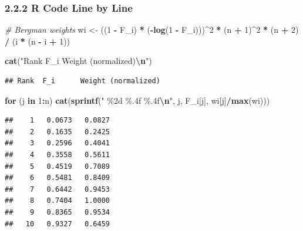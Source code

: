 \documentclass[
]{article}
\newenvironment{Shaded}{\begin{snugshade}}{\end{snugshade}}
\newcommand{\CommentTok}[1]{\textcolor[rgb]{0.56,0.35,0.01}{\textit{#1}}}
\newcommand{\ControlFlowTok}[1]{\textcolor[rgb]{0.13,0.29,0.53}{\textbf{#1}}}
\newcommand{\DecValTok}[1]{\textcolor[rgb]{0.00,0.00,0.81}{#1}}
\newcommand{\FunctionTok}[1]{\textcolor[rgb]{0.13,0.29,0.53}{\textbf{#1}}}
\newcommand{\NormalTok}[1]{#1}
\newcommand{\OtherTok}[1]{\textcolor[rgb]{0.56,0.35,0.01}{#1}}
\newcommand{\SpecialCharTok}[1]{\textcolor[rgb]{0.81,0.36,0.00}{\textbf{#1}}}
\newcommand{\StringTok}[1]{\textcolor[rgb]{0.31,0.60,0.02}{#1}}
\begin{document}
\subsubsection{2.2.2 R Code Line by Line}\label{r-code-line-by-line-1}

\begin{Shaded}
\begin{Highlighting}[]
\CommentTok{\# Bergman weights}
\NormalTok{wi }\OtherTok{\textless{}{-}}\NormalTok{ ((}\DecValTok{1} \SpecialCharTok{{-}}\NormalTok{ F\_i) }\SpecialCharTok{*}\NormalTok{ (}\SpecialCharTok{{-}}\FunctionTok{log}\NormalTok{(}\DecValTok{1} \SpecialCharTok{{-}}\NormalTok{ F\_i)))}\SpecialCharTok{\^{}}\DecValTok{2} \SpecialCharTok{*}\NormalTok{ (n }\SpecialCharTok{+} \DecValTok{1}\NormalTok{)}\SpecialCharTok{\^{}}\DecValTok{2} \SpecialCharTok{*}\NormalTok{ (n }\SpecialCharTok{+} \DecValTok{2}\NormalTok{) }\SpecialCharTok{/}\NormalTok{ (i }\SpecialCharTok{*}\NormalTok{ (n }\SpecialCharTok{{-}}\NormalTok{ i }\SpecialCharTok{+} \DecValTok{1}\NormalTok{))}

\FunctionTok{cat}\NormalTok{(}\StringTok{"Rank  F\_i      Weight (normalized)}\SpecialCharTok{\textbackslash{}n}\StringTok{"}\NormalTok{)}
\end{Highlighting}
\end{Shaded}

\begin{verbatim}
## Rank  F_i      Weight (normalized)
\end{verbatim}

\begin{Shaded}
\begin{Highlighting}[]
\ControlFlowTok{for}\NormalTok{ (j }\ControlFlowTok{in} \DecValTok{1}\SpecialCharTok{:}\NormalTok{n) }\FunctionTok{cat}\NormalTok{(}\FunctionTok{sprintf}\NormalTok{(}\StringTok{"  \%2d   \%.4f   \%.4f}\SpecialCharTok{\textbackslash{}n}\StringTok{"}\NormalTok{, j, F\_i[j], wi[j]}\SpecialCharTok{/}\FunctionTok{max}\NormalTok{(wi)))}
\end{Highlighting}
\end{Shaded}

\begin{verbatim}
##    1   0.0673   0.0827
##    2   0.1635   0.2425
##    3   0.2596   0.4041
##    4   0.3558   0.5611
##    5   0.4519   0.7089
##    6   0.5481   0.8409
##    7   0.6442   0.9453
##    8   0.7404   1.0000
##    9   0.8365   0.9534
##   10   0.9327   0.6459
\end{verbatim}
\end{document}

